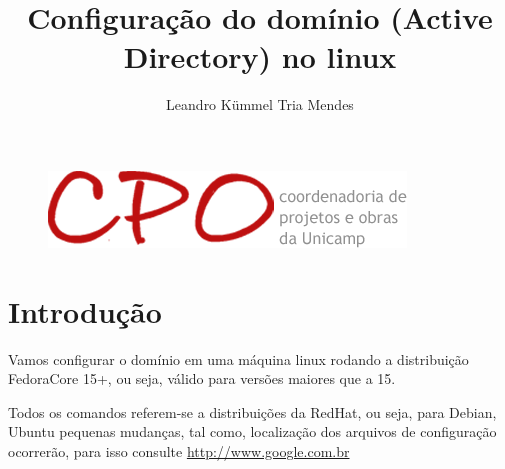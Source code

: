\documentclass[a4paper,10pt]{article}
\title{Configuração do domínio (Active Directory) no linux}
\author{Leandro Kümmel Tria Mendes}
\begin{document}
\maketitle
\begin{figure}[!htb]
  \centering
  \includegraphics[scale=0.5]{logo.png}
\end{figure}
\newpage
\section{Introdução}
Vamos configurar o domínio em uma máquina linux rodando a distribuição FedoraCore 15+, ou seja, válido para versões maiores que a 15.

Todos os comandos referem-se a distribuições da RedHat, ou seja, para Debian, Ubuntu pequenas mudanças, tal como, localização dos arquivos de configuração
ocorrerão, para isso consulte \url{http://www.google.com.br}
\end{document}
